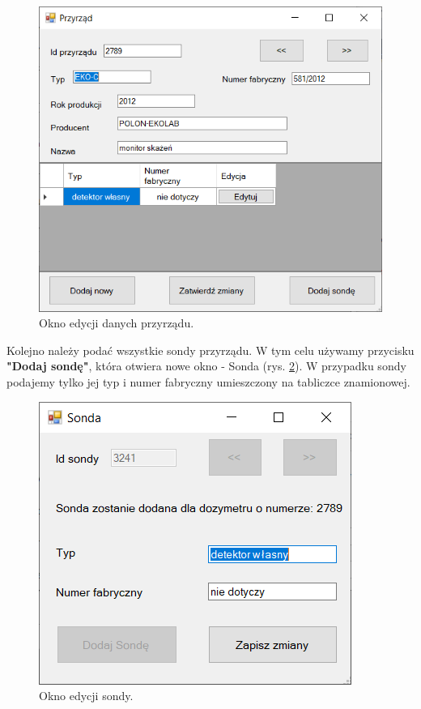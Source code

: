 \begin{figure}[htb]
	\centering
	\includegraphics{obrazki/Biuro/karta/edytuj_przyrzad.png}
	\caption{Okno edycji danych przyrządu.}
	\label{edytujPrzyrzad}
\end{figure}

Kolejno należy podać wszystkie sondy przyrządu. W tym celu używamy przycisku \textbf{"Dodaj sondę"}, która otwiera nowe okno - Sonda (rys. \ref{edytujSonde}). W przypadku sondy podajemy tylko jej typ i numer fabryczny umieszczony na tabliczce znamionowej.

\begin{figure}[H]
	\centering
	\includegraphics{obrazki/Biuro/karta/edytuj_sonde.png}
	\caption{Okno edycji sondy.}
	\label{edytujSonde}
\end{figure}

